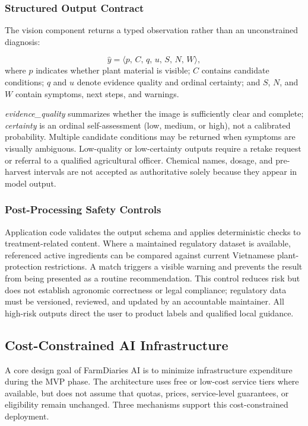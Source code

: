 \documentclass[conference]{IEEEtran}
\begin{document}
\subsubsection{Structured Output Contract}

The vision component returns a typed observation rather than an unconstrained diagnosis:

\begin{equation}
\hat{y}=\langle p,\,C,\,q,\,u,\,S,\,N,\,W\rangle,
\label{eq:yhat}
\end{equation}
where $p$ indicates whether plant material is visible; $C$ contains candidate conditions; $q$ and $u$ denote evidence quality and ordinal certainty; and $S$, $N$, and $W$ contain symptoms, next steps, and warnings.

\noindent \textit{evidence\_quality} summarizes whether the image is sufficiently clear and complete; \textit{certainty} is an ordinal self-assessment (low, medium, or high), not a calibrated probability. Multiple candidate conditions may be returned when symptoms are visually ambiguous. Low-quality or low-certainty outputs require a retake request or referral to a qualified agricultural officer. Chemical names, dosage, and pre-harvest intervals are not accepted as authoritative solely because they appear in model output.

\subsubsection{Post-Processing Safety Controls}

Application code validates the output schema and applies deterministic checks to treatment-related content. Where a maintained regulatory dataset is available, referenced active ingredients can be compared against current Vietnamese plant-protection restrictions. A match triggers a visible warning and prevents the result from being presented as a routine recommendation. This control reduces risk but does not establish agronomic correctness or legal compliance; regulatory data must be versioned, reviewed, and updated by an accountable maintainer. All high-risk outputs direct the user to product labels and qualified local guidance.

\subsection{Cost-Constrained AI Infrastructure}

A core design goal of FarmDiaries AI is to minimize infrastructure expenditure during the MVP phase. The architecture uses free or low-cost service tiers where available, but does not assume that quotas, prices, service-level guarantees, or eligibility remain unchanged. Three mechanisms support this cost-constrained deployment.
\end{document}
